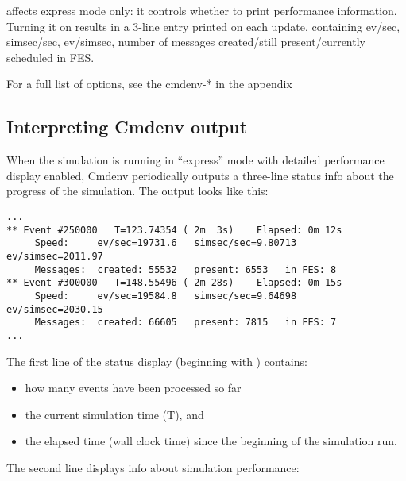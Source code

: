  affects express mode only: it controls
whether to print performance information. Turning it on results in a 3-line
entry printed on each update, containing ev/sec, simsec/sec, ev/simsec,
number of messages created/still present/currently scheduled in FES.

For a full list of options, see the cmdenv-* in the appendix


\subsection{Interpreting Cmdenv output}
\label{sec:ch-run-sim:interpreting-cmdenv-output}

When the simulation is running in ``express'' mode with detailed
performance display enabled, Cmdenv periodically outputs a three-line
status info about the progress of the simulation.
The output looks like this:

\begin{verbatim}
...
** Event #250000   T=123.74354 ( 2m  3s)    Elapsed: 0m 12s
     Speed:     ev/sec=19731.6   simsec/sec=9.80713   ev/simsec=2011.97
     Messages:  created: 55532   present: 6553   in FES: 8
** Event #300000   T=148.55496 ( 2m 28s)    Elapsed: 0m 15s
     Speed:     ev/sec=19584.8   simsec/sec=9.64698   ev/simsec=2030.15
     Messages:  created: 66605   present: 7815   in FES: 7
...
\end{verbatim}

The first line of the status display (beginning with \ttt{**})
contains:

\begin{itemize}
   \item{how many events have been processed so far}
   \item{the current simulation time (T), and}
   \item{the elapsed time (wall clock time) since the beginning of the simulation run.}
\end{itemize}

The second line displays info about simulation performance:


